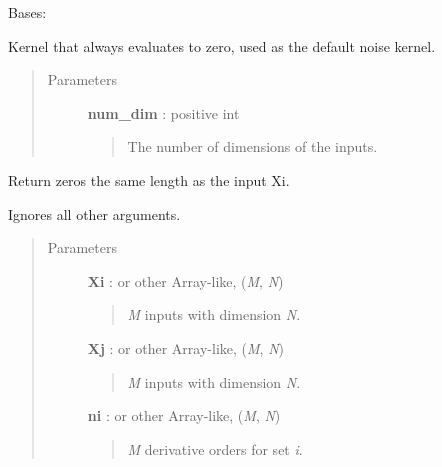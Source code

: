 \documentclass[letterpaper,10pt,english]{sphinxmanual}
\begin{document}

\begin{fulllineitems}
\label{gptools.kernel:gptools.kernel.noise.ZeroKernel}
Bases: {\hyperref[gptools.kernel:gptools.kernel.noise.DiagonalNoiseKernel]{}}

Kernel that always evaluates to zero, used as the default noise kernel.
\begin{quote}\begin{description}
\item[{Parameters }] \leavevmode
\textbf{num\_dim} : positive int
\begin{quote}

The number of dimensions of the inputs.
\end{quote}

\end{description}\end{quote}

\begin{fulllineitems}
\label{gptools.kernel:gptools.kernel.noise.ZeroKernel.__call__}
Return zeros the same length as the input Xi.

Ignores all other arguments.
\begin{quote}\begin{description}
\item[{Parameters }] \leavevmode
\textbf{Xi} :  or other Array-like, (\emph{M}, \emph{N})
\begin{quote}

\emph{M} inputs with dimension \emph{N}.
\end{quote}

\textbf{Xj} :  or other Array-like, (\emph{M}, \emph{N})
\begin{quote}

\emph{M} inputs with dimension \emph{N}.
\end{quote}

\textbf{ni} :  or other Array-like, (\emph{M}, \emph{N})
\begin{quote}

\emph{M} derivative orders for set \emph{i}.
\end{quote}


\end{description}
\end{quote}
\end{fulllineitems}
\end{fulllineitems}
\end{document}
